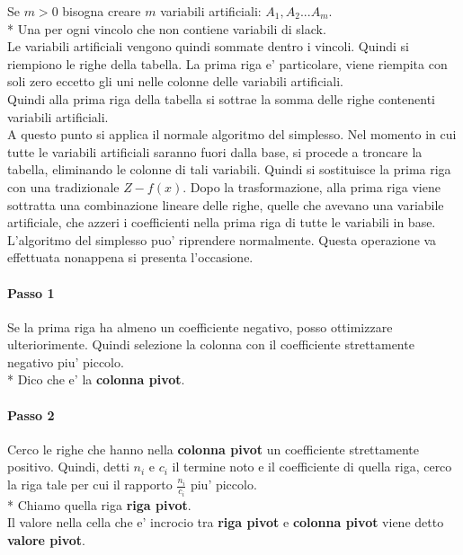 Se $m > 0$ bisogna creare $m$ variabili artificiali: $A_1, A_2 ... A_m$. \\*
Una per ogni vincolo che non contiene variabili di slack. \\

Le variabili artificiali vengono quindi sommate dentro i vincoli. Quindi si riempiono le righe della tabella. La prima riga e' particolare, viene  riempita con soli zero eccetto gli uni nelle colonne delle variabili artificiali. \\

Quindi alla prima riga della tabella si sottrae la somma delle righe contenenti variabili artificiali. \\

A questo punto si applica il normale algoritmo del simplesso. Nel momento in cui tutte le variabili artificiali saranno fuori dalla base, si procede a troncare la tabella, eliminando le colonne di tali variabili. Quindi si sostituisce la prima riga con una tradizionale $Z - f(x)$. Dopo la trasformazione, alla prima riga viene sottratta una combinazione lineare delle righe, quelle che avevano una variabile artificiale, che azzeri i coefficienti nella prima riga di tutte le variabili in base. \\

L'algoritmo del simplesso puo' riprendere normalmente. Questa operazione va effettuata nonappena si presenta l'occasione. \\

\paragraph{Passo 1}

Se la prima riga ha almeno un coefficiente negativo, posso ottimizzare ulteriorimente.
Quindi selezione la colonna con il coefficiente strettamente negativo piu' piccolo. \\*
Dico che e' la \textbf{colonna pivot}.

\paragraph{Passo 2}

Cerco le righe che hanno nella \textbf{colonna pivot} un coefficiente strettamente positivo.
Quindi, detti $n_i$ e $c_i$ il termine noto e il coefficiente di quella riga, cerco la riga tale per cui il rapporto $\frac {n_i} {c_i}$ piu' piccolo. \\*
Chiamo quella riga \textbf{riga pivot}. \\
Il valore nella cella che e' incrocio tra \textbf{riga pivot} e \textbf{colonna pivot} viene detto \textbf{valore pivot}.

